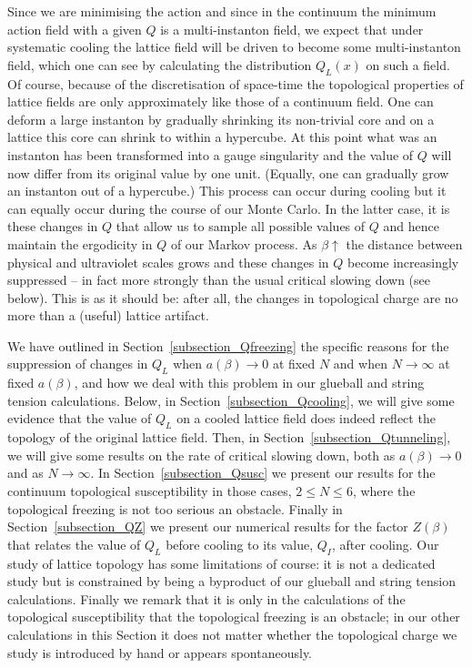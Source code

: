 \documentclass[12pt]{article}
\begin{document}
Since we are minimising the action and since in the continuum the minimum action field with a given
$Q$ is a multi-instanton field, we expect that under systematic cooling the lattice field will be driven
to become some multi-instanton field, which one can see by calculating the distribution $ Q_L(x)$ on such
a field. Of course, because of the discretisation of space-time the topological properties of lattice fields
are only approximately like those of a continuum field. One can deform a large instanton by gradually
shrinking its non-trivial core and on a lattice this core can shrink to within a hypercube. At this
point what was an instanton has been transformed into a gauge singularity and the value of $Q$
will now differ from its original value by one unit. (Equally, one can gradually grow an instanton
out of a hypercube.) This process can occur during cooling but it can equally occur during
the course of our Monte Carlo. In the latter case, it is these changes in $Q$ that allow us
to sample all possible values of $Q$ and hence maintain the ergodicity in $Q$ of our Markov process.
As $\beta\uparrow$ the distance between physical and ultraviolet scales grows and these
changes in $Q$ become increasingly suppressed -- in fact more strongly than the usual critical
slowing down (see below). This is as it should be: after all, the changes in topological charge
are no more than a (useful) lattice artifact. 

We have outlined in Section~\ref{subsection_Qfreezing} the specific reasons for the suppression
of changes in $Q_L$ when $a(\beta)\to 0$ at fixed $N$ and when $N\to \infty$ at fixed $a(\beta)$,
and how we deal with this problem in our glueball and string tension calculations.
Below, in Section~\ref{subsection_Qcooling}, we will give some evidence that the value of $Q_L$
on a cooled lattice field does indeed reflect the topology of the original lattice field.
Then, in Section~\ref{subsection_Qtunneling}, we will give some results on the rate of critical
slowing down, both as $a(\beta) \to 0$ and as $N\to\infty$. In Section~\ref{subsection_Qsusc}
we present our results for the continuum topological susceptibility in those cases, $2\leq N\leq 6$,
where the topological freezing is not too serious an obstacle. Finally in Section~\ref{subsection_QZ}
we present our numerical results for the factor $Z(\beta)$ that relates the value of $Q_L$
before cooling to its value, $Q_I$, after cooling. Our study of lattice topology has some
limitations of course: it is not a dedicated study but is constrained by being a byproduct of our
glueball and string tension calculations. Finally we remark that it is only in the calculations
of the topological susceptibility that the topological freezing is an obstacle; in our other calculations
in this Section it does not matter whether the topological charge we study is introduced by hand
or appears spontaneously.
  
\end{document}
